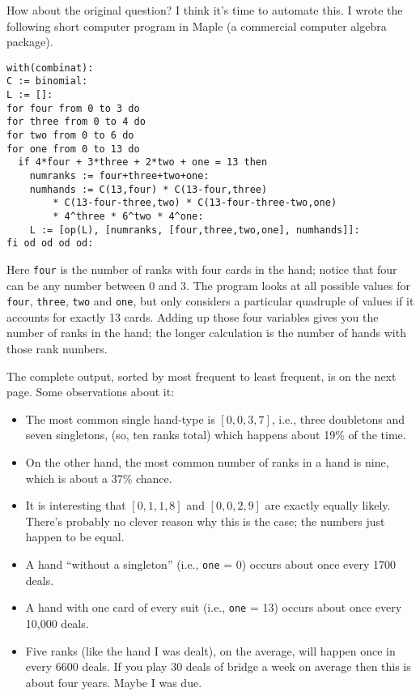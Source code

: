 How about the original question?  I think it's time to automate this. I 
wrote the following short computer program in Maple (a commercial 
computer algebra package).

\pagebreak

\begin{verbatim}
with(combinat):
C := binomial:
L := []:
for four from 0 to 3 do
for three from 0 to 4 do
for two from 0 to 6 do
for one from 0 to 13 do
  if 4*four + 3*three + 2*two + one = 13 then
    numranks := four+three+two+one:
    numhands := C(13,four) * C(13-four,three)
        * C(13-four-three,two) * C(13-four-three-two,one) 
        * 4^three * 6^two * 4^one:
    L := [op(L), [numranks, [four,three,two,one], numhands]]:
fi od od od od:
\end{verbatim}

Here \texttt{four} is the number of ranks with four cards in the hand; 
notice that four can be any number between 0 and 3.  The program looks 
at all possible values for \texttt{four}, \texttt{three}, \texttt{two} 
and \texttt{one}, but only considers a particular quadruple of values if 
it accounts for exactly 13 cards.  Adding up those four variables gives 
you the number of ranks in the hand; the longer calculation is the 
number of hands with those rank numbers.

The complete output, sorted by most frequent to least frequent, is on the next page.
Some observations about it:
\begin{itemize}
\item The most common single hand-type is $[0,0,3,7]$, i.e., three doubletons and seven singletons,
(so, ten ranks total) which happens about 19\% of the time.

\item On the other hand, the most common number of ranks in a hand is nine,
which is about a 37\% chance.

\item It is interesting that $[0,1,1,8]$ and $[0,0,2,9]$ are exactly equally likely.
There's probably no clever reason why this is the case; the numbers just happen
to be equal.

\item A hand ``without a singleton'' (i.e., \texttt{one} = 0) occurs about once every 
1700 deals.

\item A hand with one card of every suit (i.e., \texttt{one} = 13) occurs about once 
every 10,000 deals.

\item Five ranks (like the hand I was dealt), on the average, will happen once 
in every 6600 deals.  If you play 30 deals of bridge a week on average
then this is about four years.  Maybe I was due.
\end{itemize}
\pagebreak

